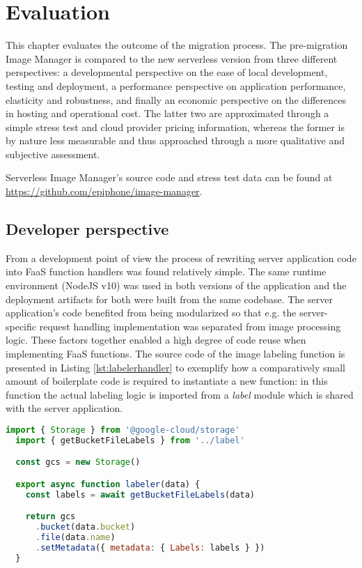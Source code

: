 \chapter{Evaluation} \label{cha:evaluation}

This chapter evaluates the outcome of the migration process. The pre-migration Image Manager is compared to the new serverless version from three different perspectives: a developmental perspective on the ease of local development, testing and deployment, a performance perspective on application performance, elasticity and robustness, and finally an economic perspective on the differences in hosting and operational cost. The latter two are approximated through a simple stress test and cloud provider pricing information, whereas the former is by nature less measurable and thus approached through a more qualitative and subjective assessment.

Serverless Image Manager's source code and stress test data can be found at \url{https://github.com/epiphone/image-manager}.

\section{Developer perspective}

From a development point of view the process of rewriting server application code into FaaS function handlers was found relatively simple. The same runtime environment (NodeJS v10) was used in both versions of the application and the deployment artifacts for both were built from the same codebase. The server application's code benefited from being modularized so that e.g. the server-specific request handling implementation was separated from image processing logic. These factors together enabled a high degree of code reuse when implementing FaaS functions. The source code of the image labeling function is presented in Listing \ref{lst:labelerhandler} to exemplify how a comparatively small amount of boilerplate code is required to instantiate a new function: in this function the actual labeling logic is imported from a \textit{label} module which is shared with the server application.

\begin{lstlisting}[language=JavaScript,caption=Image labeler function handler,captionpos=b,label=lst:labelerhandler,showstringspaces=false,belowskip=2em,frame=tb,aboveskip=2em]
  import { Storage } from '@google-cloud/storage'
  import { getBucketFileLabels } from '../label'

  const gcs = new Storage()

  export async function labeler(data) {
    const labels = await getBucketFileLabels(data)

    return gcs
      .bucket(data.bucket)
      .file(data.name)
      .setMetadata({ metadata: { Labels: labels } })
  }
\end{lstlisting}

